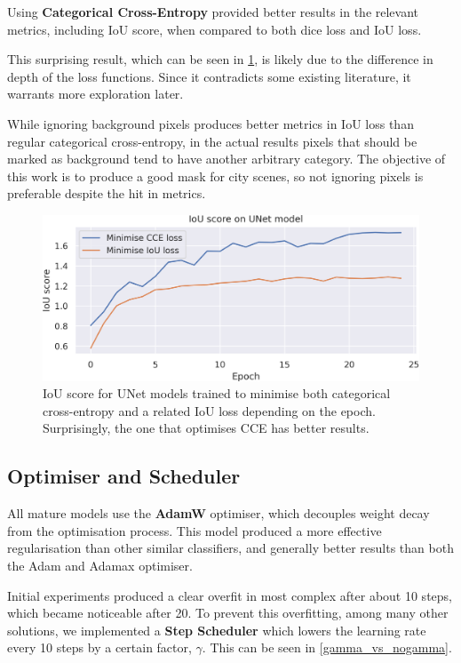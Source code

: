 Using \textbf{Categorical Cross-Entropy} provided better results in the relevant metrics, including IoU score, when compared to both dice loss and IoU loss.

This surprising result, which can be seen in \cref{iou_vs_cce}, is likely due to the difference in depth of the loss functions.
Since it contradicts some existing literature\cite{dice_loss}, it warrants more exploration later.

While ignoring background pixels produces better metrics in IoU loss than regular categorical cross-entropy, in the actual results pixels that should be marked as background tend to have another arbitrary category.
The objective of this work is to produce a good mask for city scenes, so not ignoring pixels is preferable despite the hit in metrics.

\begin{figure}
	\centering
	\includegraphics[width=.90\textwidth]{cce_vs_iou_loss.png}
	\caption{IoU score for UNet models trained to minimise both categorical cross-entropy and a related IoU loss depending on the epoch. Surprisingly, the one that optimises CCE has better results.}
	\label{iou_vs_cce}
\end{figure}

\subsection{Optimiser and Scheduler}

All mature models use the \textbf{AdamW} optimiser, which decouples weight decay from the optimisation process\cite{adamW}.
This model produced a more effective \lt{} regularisation than other similar classifiers, and generally better results than both the Adam and Adamax optimiser.

Initial experiments produced a clear overfit in most complex after about 10 steps, which became noticeable after 20.
To prevent this overfitting, among many other solutions, we implemented a \textbf{Step Scheduler} which lowers the learning rate every 10 steps by a certain factor, $\gamma$.
This can be seen in \cref{gamma_vs_nogamma}.

